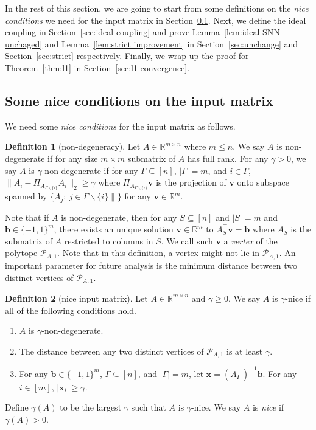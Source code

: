 \documentclass[11pt]{article}
\theoremstyle{remark}
\theoremstyle{definition}
\newtheorem{definition}{Definition}
\newcommand{\bx}{\mathbf{x}}
\newcommand{\bb}{\mathbf{b}}
\newcommand{\bv}{\mathbf{v}}
\newcommand{\R}{{\mathbb R}} %
\begin{document}
\begin{figure}[omitted: a diagram of this paper's results, not reproduced here]\label{fig:overview proof for thm l1}\end{figure}

In the rest of this section, we are going to start from some definitions on the \textit{nice conditions} we need for the input matrix in Section~\ref{sec:nice}. Next, we define the ideal coupling in Section~\ref{sec:ideal coupling} and prove Lemma~\ref{lem:ideal SNN unchaged} and Lemma~\ref{lem:strict improvement} in Section~\ref{sec:unchange} and Section~\ref{sec:strict} respectively. Finally, we wrap up the proof for Theorem~\ref{thm:l1} in Section~\ref{sec:l1 convergence}.


\subsection{Some nice conditions on the input matrix}\label{sec:nice}
We need some \textit{nice conditions} for the input matrix as follows.
\begin{definition}[non-degeneracy]
	Let $A\in\R^{m\times n}$ where $m\leq n$. We say $A$ is non-degenerate if for any size $m\times m$ submatrix of $A$ has full rank. For any $\gamma>0$, we say $A$ is $\gamma$-non-degenerate if for any $\Gamma\subseteq[n]$, $|\Gamma|=m$, and $i\in\Gamma$, $\|A_i-\Pi_{A_{\Gamma\backslash\{i\}}}A_i\|_2\geq\gamma$ where $\Pi_{A_{\Gamma\backslash\{i\}}}\bv$ is the projection of $\bv$ onto subspace spanned by $\{A_j:\ j\in\Gamma\backslash\{i\}\|\}$ for any $\bv\in\R^m$.
\end{definition}

Note that if $A$ is non-degenerate, then for any $S\subseteq[n]$ and $|S|=m$ and $\bb\in\{-1,1\}^m$, there exists an unique solution $\bv\in\R^m$ to $A_S^\top\bv=\bb$ where $A_S$ is the submatrix of $A$ restricted to columns in $S$. We call such $\bv$ a \textit{vertex} of the polytope $\mathcal{P}_{A,1}$. Note that in this definition, a vertex might not lie in $\mathcal{P}_{A,1}$. An important parameter for future analysis is the minimum distance between two distinct vertices of $\mathcal{P}_{A,1}$.


\begin{definition}[nice input matrix]\label{def:nice}
	Let $A\in\R^{m\times n}$ and $\gamma\geq0$. We say $A$ is $\gamma$-nice if all of the following conditions hold.
	\begin{enumerate}[label=(\arabic*)]
		\item $A$ is $\gamma$-non-degenerate.
		\item The distance between any two distinct vertices of $\mathcal{P}_{A,1}$ is at least $\gamma$.
		\item For any $\bb\in\{-1,1\}^m$, $\Gamma\subseteq[n]$, and $|\Gamma|=m$, let $\bx=(A_\Gamma^\top)^{-1}\bb$. For any $i\in[m]$, $|\bx_i|\geq\gamma$.
	\end{enumerate}
	Define $\gamma(A)$ to be the largest $\gamma$ such that $A$ is $\gamma$-nice. We say $A$ is \textit{nice} if $\gamma(A)>0$.
\end{definition}
\end{document}
